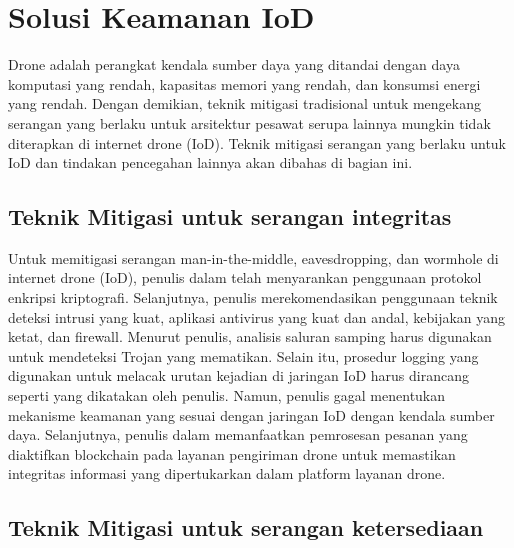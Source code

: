 \section{Solusi Keamanan IoD}
\label{sec:solusikeamanan}

Drone adalah perangkat kendala sumber daya yang ditandai dengan daya komputasi yang rendah, kapasitas memori yang rendah, dan konsumsi energi yang rendah. Dengan demikian, teknik mitigasi tradisional untuk mengekang serangan yang berlaku untuk arsitektur pesawat serupa lainnya mungkin tidak diterapkan di internet drone (IoD). Teknik mitigasi serangan yang berlaku untuk IoD dan tindakan pencegahan lainnya akan dibahas di bagian ini.

\subsection{Teknik Mitigasi untuk serangan integritas}
\label{subsec:mitigasiintegritas}

Untuk memitigasi serangan man-in-the-middle, eavesdropping, dan wormhole di internet drone (IoD), penulis dalam \citep{altawy2016security} telah menyarankan penggunaan protokol enkripsi kriptografi. Selanjutnya, penulis merekomendasikan penggunaan teknik deteksi intrusi yang kuat, aplikasi antivirus yang kuat dan andal, kebijakan yang ketat, dan firewall. Menurut penulis, analisis saluran samping harus digunakan untuk mendeteksi Trojan yang mematikan. Selain itu, prosedur logging yang digunakan untuk melacak urutan kejadian di jaringan IoD harus dirancang seperti yang dikatakan oleh penulis. Namun, penulis gagal menentukan mekanisme keamanan yang sesuai dengan jaringan IoD dengan kendala sumber daya. Selanjutnya, penulis dalam \citep{singh2020blockchain} memanfaatkan pemrosesan pesanan yang diaktifkan blockchain pada layanan pengiriman drone untuk memastikan integritas informasi yang dipertukarkan dalam platform layanan drone.

\subsection{Teknik Mitigasi untuk serangan ketersediaan}
\label{subsec:mitigasiketersediaan}

